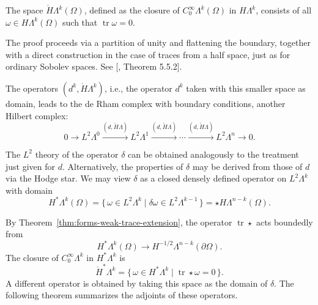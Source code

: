 \begin{Theorem}\label{thm:forms-zero-trace-characterization}
{The space $\mathring H\Lambda^k(\Omega)$, defined as the closure of $C_0^\infty\Lambda^k(\Omega)$ in $H\Lambda^k$, consists of all $\omega\in H\Lambda^k(\Omega)$ such that $\operatorname{tr}\omega=0$.}
\end{Theorem}

\begin{Proof}
{The proof proceeds via a partition of unity and flattening the boundary, together with a direct construction in the case of traces from a half space, just as for ordinary Sobolev spaces. See [, Theorem 5.5.2].}
\end{Proof}

{The operators $(d^k,\mathring H\Lambda^k)$, i.e., the operator $d^k$ taken with this smaller space as domain, leads to the de Rham complex with boundary conditions, another Hilbert complex:}
\begin{equation}\label{eq:boundary-manifold-de-rham-complex}
0\to L^2\Lambda^0\xrightarrow{(d,\mathring H\Lambda)}L^2\Lambda^1\xrightarrow{(d,\mathring H\Lambda)}\cdots\xrightarrow{(d,\mathring H\Lambda)}L^2\Lambda^n\to0.
\end{equation}

{The $L^2$ theory of the operator $\delta$ can be obtained analogously to the treatment just given for $d$. Alternatively, the properties of $\delta$ may be derived from those of $d$ via the Hodge star. We may view $\delta$ as a closed densely defined operator on $L^2\Lambda^k$ with domain}
\[
H^*\Lambda^k(\Omega)=\{\,\omega\in L^2\Lambda^k\mid\delta\omega\in L^2\Lambda^{k-1}\,\}=\star H\Lambda^{n-k}(\Omega).
\]

{By Theorem~\ref{thm:forms-weak-trace-extension}, the operator $\operatorname{tr}\star$ acts boundedly from}
\[
H^*\Lambda^k(\Omega)\to H^{-1/2}\Lambda^{n-k}(\partial\Omega).
\]
{The closure of $C_0^\infty\Lambda^k$ in $H^*\Lambda^k$ is}
\[
\mathring H^*\Lambda^k=\{\,\omega\in H^*\Lambda^k\mid\operatorname{tr}\star\omega=0\,\}.
\]
{A different operator is obtained by taking this space as the domain of $\delta$. The following theorem summarizes the adjoints of these operators.}

